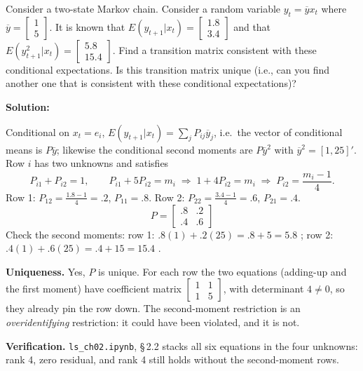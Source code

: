 \documentclass[12pt, letterpaper]{article}
\newcommand{\yb}{\overline{y}}
\newcommand{\nb}[1]{\texttt{ls\_ch02.ipynb}, \S\,#1}
\begin{document}
\begin{tcolorbox}[evenbox,title={Exercise 2.2 \quad Recovering $P$ from Conditional Moments}]
\begin{tcolorbox}[questionbox]
Consider a two-state Markov chain. Consider a random variable $y_t=\yb x_t$ where
$\yb=\begin{bmatrix}1\\5\end{bmatrix}$. It is known that
$E(y_{t+1}|x_t)=\begin{bmatrix}1.8\\3.4\end{bmatrix}$ and that
$E(y^2_{t+1}|x_t)=\begin{bmatrix}5.8\\15.4\end{bmatrix}$. Find a transition matrix consistent with these
conditional expectations. Is this transition matrix unique (i.e., can you find another one that is
consistent with these conditional expectations)?
\end{tcolorbox}

\textbf{Solution:}

Conditional on $x_t=e_i$, $E(y_{t+1}|x_t)=\sum_jP_{ij}\yb_j$, i.e.\ the vector of conditional
means is $P\yb$; likewise the conditional second moments are $P\yb^{2}$ with $\yb^2=[1,25]'$.
Row $i$ has two unknowns and satisfies
\[
P_{i1}+P_{i2}=1,\qquad P_{i1}+5P_{i2}=m_i\;\Rightarrow\;1+4P_{i2}=m_i\;\Rightarrow\;P_{i2}=\frac{m_i-1}{4}.
\]
Row 1: $P_{12}=\frac{1.8-1}{4}=.2$, $P_{11}=.8$. Row 2: $P_{22}=\frac{3.4-1}{4}=.6$, $P_{21}=.4$.
\[
\boxed{P=\begin{bmatrix}.8&.2\\.4&.6\end{bmatrix}}
\]
Check the second moments: row 1: $.8(1)+.2(25)=.8+5=5.8$ \checkmark; row 2: $.4(1)+.6(25)=.4+15=15.4$ \checkmark.

\textbf{Uniqueness.} Yes, $P$ is unique. For each row the two equations (adding-up and the first
moment) have coefficient matrix $\begin{bmatrix}1&1\\1&5\end{bmatrix}$, with determinant $4\neq0$,
so they already pin the row down. The second-moment restriction is an \emph{overidentifying}
restriction: it could have been violated, and it is not.

\textbf{Verification.} \nb{2.2} stacks all six equations in the four unknowns: rank 4, zero
residual, and rank 4 still holds without the second-moment rows. \checkmark
\end{tcolorbox}
\end{document}
